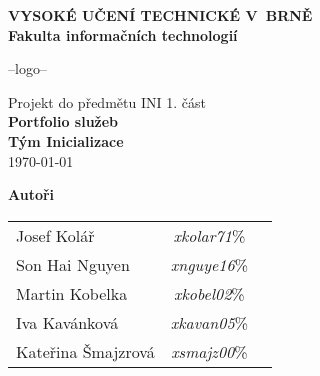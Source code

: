 \begin{titlepage}
    \centering

    {\fontsize{20pt}{15pt}\bfseries
    VYSOKÉ UČENÍ TECHNICKÉ V~BRNĚ\\
    \vspace{8pt}
    Fakulta informačních technologií
    }

    \vspace*{64pt}

    --logo--
    \vspace*{22pt}

    {\Large Projekt do předmětu INI 1. část\\}
    \vspace*{4pt}
    {\LARGE \bfseries Portfolio služeb\\}
    \vspace*{120pt}
    {\Large \bfseries Tým Inicializace\\}
    \vspace*{120pt}
    {\Large \today}

    \vspace*{100pt}
    {\Large \bfseries Autoři\\}
    \vspace*{12pt}

    \begin{tabular}{ l c r }
        Josef Kolář & \textit{xkolar71}\% \\
        Son Hai Nguyen & \textit{xnguye16}\% \\
        Martin Kobelka & \textit{xkobel02}\% \\
        Iva Kavánková & \textit{xkavan05}\% \\
        Kateřina Šmajzrová & \textit{xsmajz00}\% \\
    \end{tabular}\\

\end{titlepage}